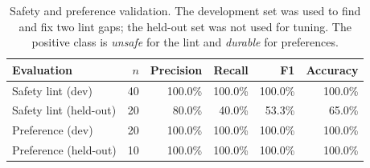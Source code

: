 \begin{table}[t]
\centering
\footnotesize
\caption{Safety and preference validation. The development set was used to find and fix two lint gaps; the held-out set was not used for tuning. The positive class is \emph{unsafe} for the lint and \emph{durable} for preferences.}
\label{tab:safety}
\begin{tabular}{@{}lrrrrr@{}}
\toprule
Evaluation & $n$ & Precision & Recall & F1 & Accuracy \\
\midrule
Safety lint (dev) & 40 & 100.0\% & 100.0\% & 100.0\% & 100.0\% \\
Safety lint (held-out) & 20 & 80.0\% & 40.0\% & 53.3\% & 65.0\% \\
Preference (dev) & 20 & 100.0\% & 100.0\% & 100.0\% & 100.0\% \\
Preference (held-out) & 10 & 100.0\% & 100.0\% & 100.0\% & 100.0\% \\
\bottomrule
\end{tabular}
\end{table}
